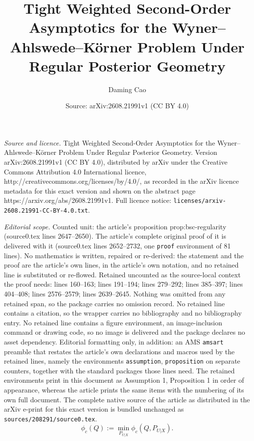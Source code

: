 \documentclass[10pt,a4paper]{amsart}
\title{Tight Weighted Second-Order Asymptotics for the Wyner--Ahlswede--K\"orner Problem Under Regular Posterior Geometry}
\author{Daming Cao}
\date{Source: arXiv:2608.21991v1 (CC BY 4.0)}
\begin{document}
\maketitle

\noindent\emph{Source and licence.} Tight Weighted Second-Order Asymptotics for the Wyner--Ahlswede--K\"orner Problem Under Regular Posterior Geometry. Version arXiv:2608.21991v1 (CC BY 4.0), distributed by arXiv under the Creative Commons Attribution 4.0 International licence, http://creativecommons.org/licenses/by/4.0/, as recorded in the arXiv licence metadata for this exact version and shown on the abstract page https://arxiv.org/abs/2608.21991v1. Full licence notice: \texttt{licenses/arxiv-2608.21991-CC-BY-4.0.txt}.\par\smallskip

\noindent\textit{Editorial scope.} Counted unit: the article's proposition prop:bsc-regularity (source0.tex lines 2647--2650). The article's complete original proof of it is delivered with it (source0.tex lines 2652--2732, one \texttt{proof} environment of 81 lines). No mathematics is written, repaired or re-derived: the statement and the proof are the article's own lines, in the article's own notation, and no retained line is substituted or re-flowed.  Retained uncounted as the source-local context the proof needs: lines 160--163; lines 191--194; lines 279--292; lines 385--397; lines 404--408; lines 2576--2579; lines 2639--2645.  Nothing was omitted from any retained span, so the package carries no omission record.  No retained line contains a citation, so the wrapper carries no bibliography and no bibliography entry.  No retained line contains a figure environment, an image-inclusion command or drawing code, so no image is delivered and the package declares no asset dependency.  Editorial formatting only, in addition: an AMS \texttt{amsart} preamble that restates the article's own declarations and macros used by the retained lines, namely the environments \texttt{assumption}, \texttt{proposition} on separate counters, together with the standard packages those lines need.  The retained environments print in this document as Assumption 1, Proposition 1 in order of appearance, whereas the article prints the same items with the numbering of its own full document.  The complete native source of the article as distributed in the arXiv e-print for this exact version is bundled unchanged as \texttt{sources/208291/source0.tex}.
\begin{equation}
\phi_c(Q):=\min_{P_{U|X}}\phi_c(Q,P_{U|X}).
\label{eq:phi}
\end{equation}
\end{document}
